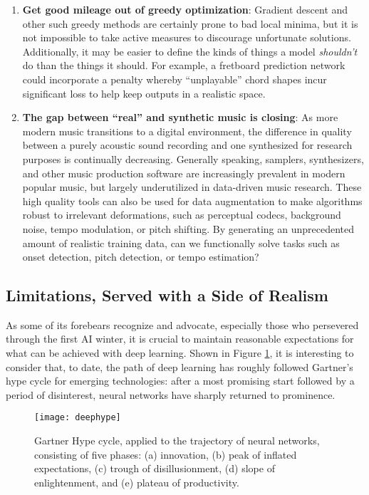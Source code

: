 \begin{enumerate}
\item \textbf{Get good mileage out of greedy optimization}:
Gradient descent and other such greedy methods are certainly prone to bad local minima, but it is not impossible to take active measures to discourage unfortunate solutions.
Additionally, it may be easier to define the kinds of things a model \emph{shouldn't} do than the things it should.
For example, a fretboard prediction network could incorporate a penalty whereby ``unplayable'' chord shapes incur significant loss to help keep outputs in a realistic space.


\item \textbf{The gap between ``real'' and synthetic music is closing}:
As more modern music transitions to a digital environment, the difference in quality between a purely acoustic sound recording and one synthesized for research purposes is continually decreasing.
Generally speaking, samplers, synthesizers, and other music production software are increasingly prevalent in modern popular music, but largely underutilized in data-driven music research.
These high quality tools can also be used for data augmentation to make algorithms robust to irrelevant deformations, such as perceptual codecs, background noise, tempo modulation, or pitch shifting.
By generating an unprecedented amount of realistic training data, can we functionally solve tasks such as onset detection, pitch detection, or tempo estimation?

\end{enumerate}


\subsection{Limitations, Served with a Side of Realism}

As some of its forebears recognize and advocate, especially those who persevered through the first AI winter, it is crucial to maintain reasonable expectations for what can be achieved with deep learning.
Shown in Figure \ref{fig:deephype}, it is interesting to consider that, to date, the path of deep learning has roughly followed Gartner's hype cycle for emerging technologies:
after a most promising start followed by a period of disinterest, neural networks have sharply returned to prominence.

\begin{figure}
\begin{centering}
\texttt{[image: deephype]}
\caption{Gartner Hype cycle, applied to the trajectory of neural networks, consisting of five phases: (a) innovation, (b) peak of inflated expectations, (c) trough of disillusionment, (d) slope of enlightenment, and (e) plateau of productivity.}
\label{fig:deephype}
\end{centering}
\end{figure}

